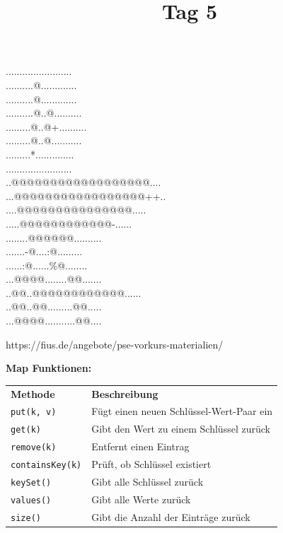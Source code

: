 \documentclass{../../sheet}
\title{\vkTitle\ Tag 5}
\begin{document}
\maketitle

\aufgabe{\vkEventDayFiveTitle}
\vkEventDayFiveText
\begin{ausgabe}
........................\\
..........@.............\\
..........@.............\\
..........@..@..........\\
.........@..@+..........\\
.........@..@...........\\
.........*..............\\
........................\\
..@@@@@@@@@@@@@@@@@@....\\
...@@@@@@@@@@@@@@@@@++..\\
....@@@@@@@@@@@@@@@.....\\
.....@@@@@@@@@@@@-......\\
........@@@@@@..........\\
.......-@....:@.........\\
......:@......\%@........\\
...@@@@........@@.......\\
..@@..@@@@@@@@@@@@......\\
..@@..@@.........@@.....\\
...@@@@...........@@....
\end{ausgabe}


https://fius.de/angebote/pse-vorkurs-materialien/

\newpage
{}
\textbf{Map Funktionen:}
\begin{table}[h]
    \centering
    \begin{tabular}{l l}
        \rowcolor{tablehead}
        \textbf{Methode}        & \textbf{Beschreibung}                    \\
        \texttt{put(k, v)}      & Fügt einen neuen Schlüssel-Wert-Paar ein \\
        \texttt{get(k)}         & Gibt den Wert zu einem Schlüssel zurück  \\
        \texttt{remove(k)}      & Entfernt einen Eintrag                   \\
        \texttt{containsKey(k)} & Prüft, ob Schlüssel existiert            \\
        \texttt{keySet()}       & Gibt alle Schlüssel zurück               \\
        \texttt{values()}       & Gibt alle Werte zurück                   \\
        \texttt{size()}         & Gibt die Anzahl der Einträge zurück      \\
    \end{tabular}
\end{table}
\end{document}
